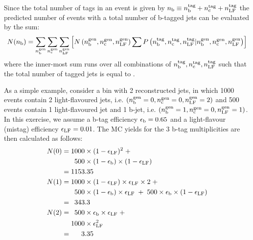 Since the total number of tags in an event is given by 
$n_{\text{b}} \equiv n_{\rm b}^{\rm tag} + n_{\rm c}^{\rm tag} + n_{\rm LF}^{\rm tag}$
the predicted number of events with a total number of b-tagged jets can be evaluated
by the sum:
\begin{equation}
	N(n_{\text{b}}) = \sum_{n_{\text{b}}^{\rm gen}} \sum_{n_{\rm c}^{\rm gen}} \sum_{n_{\rm LF}^{\rm gen}}
	\left[
N\left(n_{\text{b}}^{\rm gen},n_{\rm c}^{\rm gen},n_{\rm LF}^{\rm gen}\right)
\sum P\left(n_{\rm b}^{\rm tag},  n_{\rm c}^{\rm tag}, n_{\rm LF}^{\rm tag}| 
  n_{\rm b}^{\rm gen},  n_{\rm c}^{\rm gen}, n_{\rm LF}^{\rm gen}\right) 
	\right]
\end{equation}
where the inner-most sum runs over all combinations of 
$n_{\text{b}}^{\rm tag},n_{\rm c}^{\rm tag},n_{\rm LF}^{\rm tag}$
such that the total number of tagged jets is equal to \nb.

As a simple example, consider a bin with 2 reconstructed jets, in
which 1000 events contain 2 light-flavoured jets, i.e. $(n_{\rm
  b}^{\rm gen} = 0,n_{\rm c}^{\rm gen} = 0,n_{\rm LF}^{\rm gen} = 2)$
and 500 events contain 1 light-flavoured jet and 1 b-jet,
i.e. $(n_{\rm b}^{\rm gen} = 1,n_{\rm c}^{\rm gen} = 0,n_{\rm LF}^{\rm
  gen} = 1)$.  In this exercise, we assume a b-tag efficiency
$\epsilon_{\rm b} = 0.65$ and a light-flavour (mistag) efficiency
$\epsilon_{\rm LF} = 0.01$.  The MC yields for the 3 b-tag
multiplicities are then calculated as follows:
\begin{align*}
N(0) = & \; 1000\times (1-\epsilon_{\rm LF})^2 \;+                                \\
       & \; \phantom{1}500\times(1-\epsilon_{\rm b})\times(1-\epsilon_{\rm LF})   \\
     = & \; 1153.35                                                               \\
N(1) = & \; 1000\times (1-\epsilon_{\rm LF})\times \epsilon_{\rm LF} \times 2 \;+ \\
       & \; \phantom{1}500\times (1-\epsilon_{\rm b})\times\epsilon_{\rm LF} \;+\;  
       500\times \epsilon_{\rm b} \times (1-\epsilon_{\rm LF})                    \\
     = & \; \phantom{1}343.3                                                      \\
N(2) = & \; \phantom{1}500\times \epsilon_{\rm b} \times \epsilon_{\rm LF} \;+    \\
       & \; 1000\times \epsilon_{\rm LF}^2                                        \\
     = & \; \phantom{100}3.35
\end{align*}

